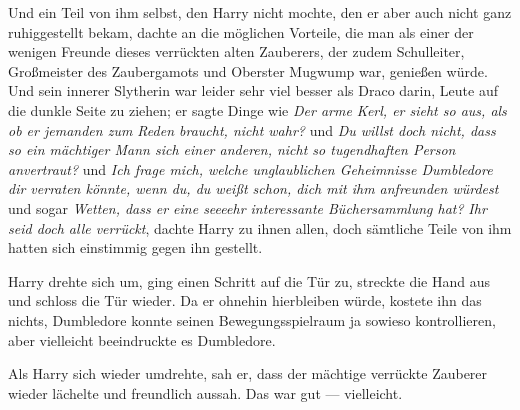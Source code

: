 Und ein Teil von ihm selbst, den Harry nicht mochte, den er aber auch nicht ganz ruhiggestellt bekam, dachte an die möglichen Vorteile, die man als einer der wenigen Freunde dieses verrückten alten Zauberers, der zudem Schulleiter, Großmeister des Zaubergamots und Oberster Mugwump war, genießen würde. Und sein innerer Slytherin war leider sehr viel besser als Draco darin, Leute auf die dunkle Seite zu ziehen; er sagte Dinge wie \emph{Der arme Kerl, er sieht so aus, als ob er jemanden zum Reden braucht, nicht wahr?} und \emph{Du willst doch nicht, dass so ein mächtiger Mann sich einer anderen, nicht so tugendhaften Person anvertraut?} und \emph{Ich frage mich, welche unglaublichen Geheimnisse Dumbledore dir verraten könnte, wenn du, du weißt schon, dich mit ihm anfreunden würdest} und sogar \emph{Wetten, dass er eine seeeehr interessante Büchersammlung hat?}
\emph{Ihr seid doch alle verrückt}, dachte Harry zu ihnen allen, doch sämtliche Teile von ihm hatten sich einstimmig gegen ihn gestellt.

Harry drehte sich um, ging einen Schritt auf die Tür zu, streckte die Hand aus und schloss die Tür wieder. Da er ohnehin hierbleiben würde, kostete ihn das nichts, Dumbledore konnte seinen Bewegungsspielraum ja sowieso kontrollieren, aber vielleicht beeindruckte es Dumbledore.

Als Harry sich wieder umdrehte, sah er, dass der mächtige verrückte Zauberer wieder lächelte und freundlich aussah. Das war gut — vielleicht.

